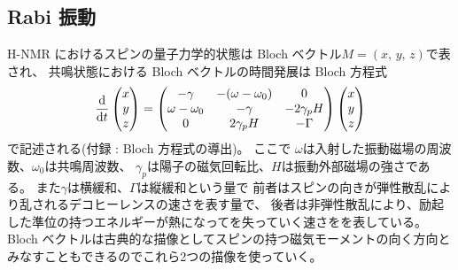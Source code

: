 \documentclass[11pt,dvipdfmx,a4paper]{jsarticle}
\begin{document}
\subsection{Rabi 振動}
H-NMR におけるスピンの量子力学的状態は Bloch ベクトル\(M = (x,\,y,\,z)\)で表され、
共鳴状態における Bloch ベクトルの時間発展は Bloch 方程式
\begin{equation}
	\dv{t}
	\begin{pmatrix}
		x\\ y\\ z
	\end{pmatrix}
	=
	\begin{pmatrix}
		-\gamma & -(\omega-\omega_0) & 0\\
		\omega -\omega_0 & -\gamma & -2\gamma_p H\\
		0 & 2\gamma_p H & -\Gamma
	\end{pmatrix}
	\begin{pmatrix}
		x\\ y\\ z
	\end{pmatrix}
\end{equation}
で記述される(付録 : Bloch 方程式の導出)。
ここで
\(\omega\)は入射した振動磁場の周波数、\(\omega_0\)は共鳴周波数、
\(\gamma_p\)は陽子の磁気回転比、\(H\)は振動外部磁場の強さである。
また\(\gamma\)は横緩和、\(\Gamma\)は縦緩和という量で
前者はスピンの向きが弾性散乱により乱されるデコヒーレンスの速さを表す量で、
後者は非弾性散乱により、励起した準位の持つエネルギーが熱になってを失っていく速さをを表している。 %
Bloch ベクトルは古典的な描像としてスピンの持つ磁気モーメントの向く方向とみなすこともできるのでこれら2つの描像を使っていく。
\end{document}
